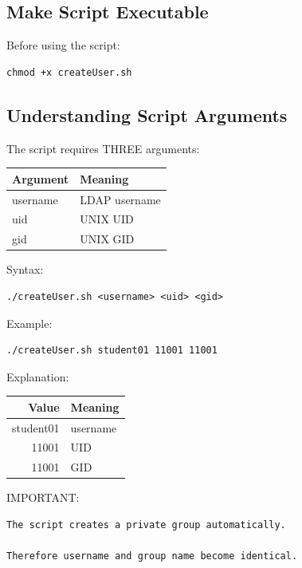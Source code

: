 \documentclass[11pt]{article}
\begin{document}
\subsection{Make Script Executable}
\label{sec:orga6dbdfd}

Before using the script:

\begin{verbatim}
chmod +x createUser.sh
\end{verbatim}
\subsection{Understanding Script Arguments}
\label{sec:org477ffc2}

The script requires THREE arguments:

\begin{center}
\begin{tabular}{ll}
Argument & Meaning\\
\hline
username & LDAP username\\
uid & UNIX UID\\
gid & UNIX GID\\
\end{tabular}
\end{center}

Syntax:

\begin{verbatim}
./createUser.sh <username> <uid> <gid>
\end{verbatim}

Example:

\begin{verbatim}
./createUser.sh student01 11001 11001
\end{verbatim}

Explanation:

\begin{center}
\begin{tabular}{rl}
Value & Meaning\\
\hline
student01 & username\\
11001 & UID\\
11001 & GID\\
\end{tabular}
\end{center}

IMPORTANT:

\begin{verbatim}
The script creates a private group automatically.

Therefore username and group name become identical.
\end{verbatim}
\end{document}
